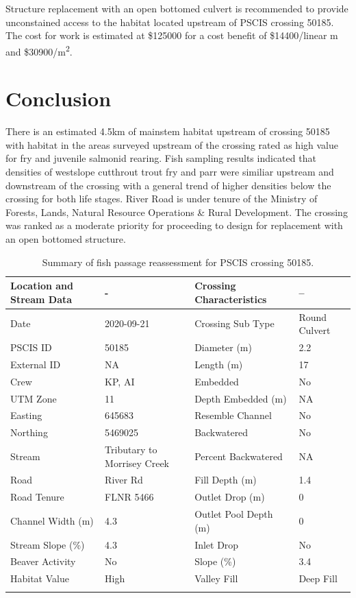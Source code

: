 \documentclass[
]{book}
\begin{document}
Structure replacement with an open bottomed culvert is recommended to provide unconstained access to the habitat located upstream of PSCIS crossing 50185. The cost for work is estimated at \$125000 for a cost benefit of \$14400/linear m and \$30900/m\textsuperscript{2}.

\hypertarget{conclusion-3}{%
\section*{Conclusion}\label{conclusion-3}}

There is an estimated 4.5km of mainstem habitat upstream of crossing 50185 with habitat in the areas surveyed upstream of the crossing rated as high value for fry and juvenile salmonid rearing. Fish sampling results indicated that densities of westslope cutthrout trout fry and parr were similiar upstream and downstream of the crossing with a general trend of higher densities below the crossing for both life stages. River Road is under tenure of the Ministry of Forests, Lands, Natural Resource Operations \& Rural Development. The crossing was ranked as a moderate priority for proceeding to design for replacement with an open bottomed structure.

\begin{table}

\caption{\label{tab:tab-culvert-030}Summary of fish passage reassessment for PSCIS crossing 50185.}
\centering
\fontsize{11}{13}\selectfont
\begin{tabu} to 
\hline
Location and Stream Data & - & Crossing Characteristics & --\\
\hline
Date & 2020-09-21 & Crossing Sub Type & Round Culvert\\
\hline
PSCIS ID & 50185 & Diameter (m) & 2.2\\
\hline
External ID & NA & Length (m) & 17\\
\hline
Crew & KP, AI & Embedded & No\\
\hline
UTM Zone & 11 & Depth Embedded (m) & NA\\
\hline
Easting & 645683 & Resemble Channel & No\\
\hline
Northing & 5469025 & Backwatered & No\\
\hline
Stream & Tributary to Morrisey Creek & Percent Backwatered & NA\\
\hline
Road & River Rd & Fill Depth (m) & 1.4\\
\hline
Road Tenure & FLNR 5466 & Outlet Drop (m) & 0\\
\hline
Channel Width (m) & 4.3 & Outlet Pool Depth (m) & 0\\
\hline
Stream Slope (\%) & 4.3 & Inlet Drop & No\\
\hline
Beaver Activity & No & Slope (\%) & 3.4\\
\hline
Habitat Value & High & Valley Fill & Deep Fill\\
\hline
{}\\
\end{tabu}
\end{table}
\end{document}
